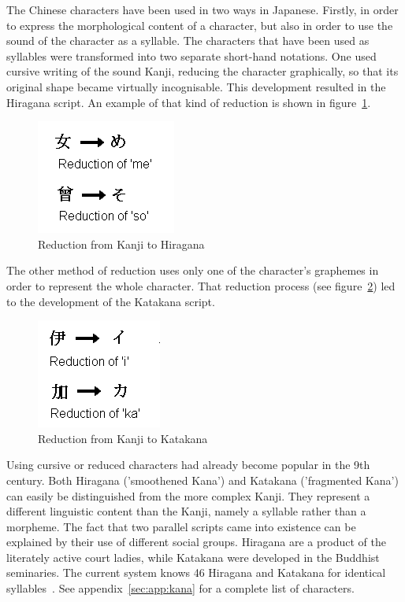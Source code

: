 The Chinese characters have been used in two ways in Japanese. 
Firstly, in order to express the morphological content of a character,
but also in order to use the sound of the character as a syllable.
The characters that have been used as syllables were transformed into two 
separate short-hand notations. 
One used cursive writing of the sound Kanji, reducing the character 
graphically, so that its original shape became virtually incognisable.
This development resulted in the Hiragana script. An example of that kind of 
reduction is shown in figure~\ref{fig:reductiontohiragana}.
\begin{figure}[htbp]
\begin{center}
\includegraphics[scale=0.7]{images/reductiontohiragana.png}
\caption{Reduction from Kanji to Hiragana}
\label{fig:reductiontohiragana}
\end{center}
\end{figure}
The other method of reduction uses only one of the character's graphemes in
order to represent the whole character. That reduction process (see 
figure~\ref{fig:reductiontokatakana}) led to the development of the
Katakana script.
\begin{figure}[htbp] 
\begin{center}
\includegraphics[scale=0.7]{images/reductiontokatakana.png}
\caption{Reduction from Kanji to Katakana}
\label{fig:reductiontokatakana}
\end{center}
\end{figure}

Using cursive or reduced characters had already become popular in the 9th 
century.
Both Hiragana ('smoothened Kana') and Katakana ('fragmented Kana') can easily be 
distinguished from the more complex Kanji. They represent a different linguistic 
content than the Kanji, namely a syllable rather than a morpheme.
The fact that two parallel scripts came into existence can be explained by 
their use of different social groups. Hiragana are a product of the literately 
active court ladies, while Katakana were developed in the Buddhist seminaries.
The current system knows 46 Hiragana and Katakana for identical 
syllables~. See appendix~\ref{sec:app:kana} for a 
complete list of characters.

